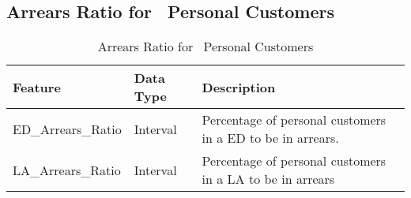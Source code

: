 \subsection{Arrears Ratio for \subjectname\ Personal Customers}
\begin{table}[H]
	\centering
	\resizebox{\textwidth}{!}
	{
	\label{my-label}
	\begin{tabular}{|l|l|l|}
		\hline
		\textbf{Feature} & \textbf{Data Type} & \textbf{Description}                                                                                                                                                                                                                                                                                                                                                                                                                                                                                                                              \\ \hline
		ED\_Arrears\_Ratio          & Interval        & Percentage of personal customers in a ED to be in arrears.                                                                                                                                                                                                                                                                                                                                                                           \\ 
		LA\_Arrears\_Ratio           & Interval        & Percentage of personal customers in a LA to be in arrears \\ \hline
	\end{tabular}
	}
	\caption{Arrears Ratio for \subjectname\ Personal Customers }
\end{table}

